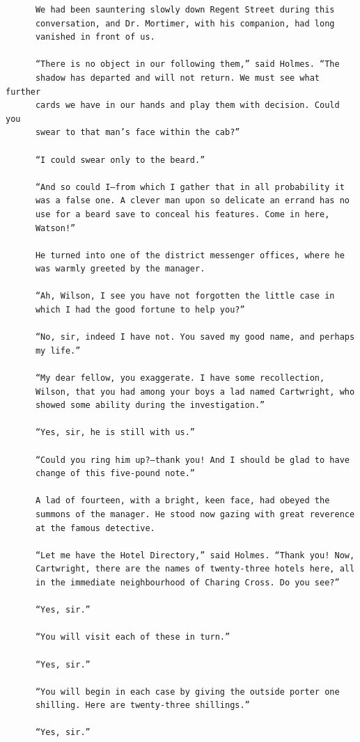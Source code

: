\documentclass{article}
\begin{document}
\begin{verbatim}
      We had been sauntering slowly down Regent Street during this
      conversation, and Dr. Mortimer, with his companion, had long
      vanished in front of us.

      “There is no object in our following them,” said Holmes. “The
      shadow has departed and will not return. We must see what further
      cards we have in our hands and play them with decision. Could you
      swear to that man’s face within the cab?”

      “I could swear only to the beard.”

      “And so could I—from which I gather that in all probability it
      was a false one. A clever man upon so delicate an errand has no
      use for a beard save to conceal his features. Come in here,
      Watson!”

      He turned into one of the district messenger offices, where he
      was warmly greeted by the manager.

      “Ah, Wilson, I see you have not forgotten the little case in
      which I had the good fortune to help you?”

      “No, sir, indeed I have not. You saved my good name, and perhaps
      my life.”

      “My dear fellow, you exaggerate. I have some recollection,
      Wilson, that you had among your boys a lad named Cartwright, who
      showed some ability during the investigation.”

      “Yes, sir, he is still with us.”

      “Could you ring him up?—thank you! And I should be glad to have
      change of this five-pound note.”

      A lad of fourteen, with a bright, keen face, had obeyed the
      summons of the manager. He stood now gazing with great reverence
      at the famous detective.

      “Let me have the Hotel Directory,” said Holmes. “Thank you! Now,
      Cartwright, there are the names of twenty-three hotels here, all
      in the immediate neighbourhood of Charing Cross. Do you see?”

      “Yes, sir.”

      “You will visit each of these in turn.”

      “Yes, sir.”

      “You will begin in each case by giving the outside porter one
      shilling. Here are twenty-three shillings.”

      “Yes, sir.”


\end{verbatim}
\end{document}
